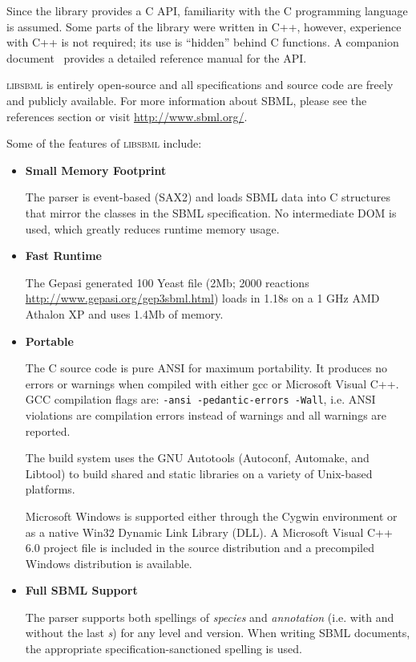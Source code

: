 \documentclass{cekmanual}
\newcommand{\libsbml}{\textsc{libsbml}}
\begin{document}
Since the library provides a C API, familiarity with the C programming
language is assumed.  Some parts of the library were written in C++,
however, experience with C++ is not required; its use is ``hidden''
behind C functions.  A companion document~\citep{bornstein:2003b} provides
a detailed reference manual for the API.

\libsbml{} is entirely open-source and all specifications and
source code are freely and publicly available.  For more information
about SBML, please see the references section or visit
\url{http://www.sbml.org/}.

Some of the features of \textsc{libsbml} include:


\begin{itemize}

  \item \textbf{Small Memory Footprint}

  The parser is event-based (SAX2) and loads SBML data into C
  structures that mirror the classes in the SBML specification.  No
  intermediate DOM is used, which greatly reduces runtime memory
  usage.

  \item \textbf{Fast Runtime}

  The Gepasi generated 100 Yeast file (2Mb; 2000 reactions
  \url{http://www.gepasi.org/gep3sbml.html}) loads in 1.18s on a 1 GHz
  AMD Athalon XP and uses 1.4Mb of memory.

  \item \textbf{Portable}

  The C source code is pure ANSI for maximum portability.  It produces
  no errors or warnings when compiled with either gcc or Microsoft
  Visual C++.  GCC compilation flags are: \texttt{-ansi
  -pedantic-errors -Wall}, i.e. ANSI violations are compilation errors
  instead of warnings and all warnings are reported.

  The build system uses the GNU Autotools (Autoconf, Automake, and
  Libtool) to build shared and static libraries on a variety of
  Unix-based platforms.

  Microsoft Windows is supported either through the Cygwin environment
  or as a native Win32 Dynamic Link Library (DLL).  A Microsoft Visual
  C++ 6.0 project file is included in the source distribution and a
  precompiled Windows distribution is available.

  \item \textbf{Full SBML Support}

  The parser supports both spellings of \emph{species} and
  \emph{annotation} (i.e. with and without the last \emph{s}) for any
  level and version.  When writing SBML documents, the appropriate
  specification-sanctioned spelling is used.


\end{itemize}
\end{document}
